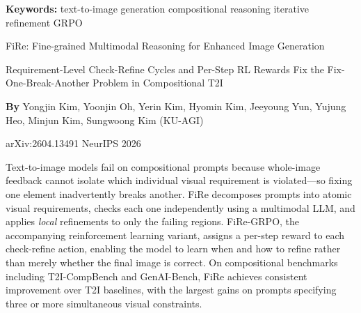 \documentclass[10pt,twocolumn]{article}
\begin{document}
\setlength{\parindent}{0pt}
\setlength{\parskip}{4pt}

{\small\color{keywordgray}\textbf{Keywords:}
  text-to-image generation \textbullet{}
  compositional reasoning \textbullet{}
  iterative refinement \textbullet{}
  GRPO}\par\vspace{4pt}

{\LARGE\bfseries\raggedright
  FiRe: Fine-grained Multimodal Reasoning for Enhanced Image
  Generation}\par\vspace{4pt}

{\large\itshape\raggedright
  Requirement-Level Check-Refine Cycles and Per-Step RL Rewards
  Fix the Fix-One-Break-Another Problem in Compositional T2I}\par\vspace{6pt}

{\small\textbf{By} Yongjin Kim, Yoonjin Oh, Yerin Kim, Hyomin Kim,
  Jeeyoung Yun, Yujung Heo, Minjun Kim, Sungwoong Kim (KU-AGI)}\par\vspace{2pt}

{\small\color{keywordgray}arXiv:2604.13491 \textbullet{}
  NeurIPS 2026}
\par\vspace{2pt}\noindent{\color{rulered}\rule{\columnwidth}{0.6pt}}\vspace{6pt}

Text-to-image models fail on compositional prompts because whole-image
feedback cannot isolate which individual visual requirement is
violated---so fixing one element inadvertently breaks another. FiRe
decomposes prompts into atomic visual requirements, checks each one
independently using a multimodal LLM, and applies \emph{local}
refinements to only the failing regions. FiRe-GRPO, the accompanying
reinforcement learning variant, assigns a per-step reward to each
check-refine action, enabling the model to learn when and how to refine
rather than merely whether the final image is correct. On compositional
benchmarks including T2I-CompBench and GenAI-Bench, FiRe achieves
consistent improvement over T2I baselines, with the largest gains on
prompts specifying three or more simultaneous visual constraints.
\end{document}
